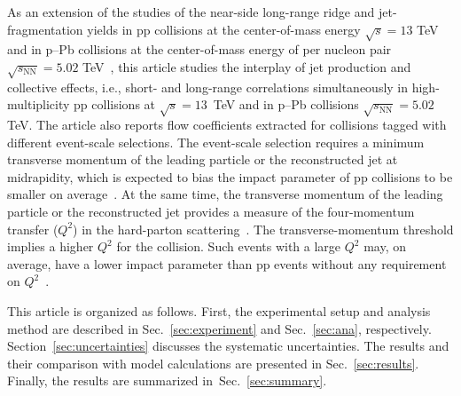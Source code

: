 As an extension of the studies of the near-side long-range ridge and jet-fragmentation yields in pp collisions at the center-of-mass energy $\sqrt{s}=13$ TeV~\cite{ALICE:2021nir} and in p--Pb collisions at the center-of-mass energy of per nucleon pair $\sqrt{s_{\mathrm{NN}}}=5.02$ TeV~\cite{ALICE:2012eyl,ALICE:2013snk}, this article studies the interplay of jet production and collective effects, i.e., short- and long-range correlations simultaneously in high-multiplicity pp collisions at $\sqrt{s} =13$~TeV and in p--Pb collisions $\sqrt{s_{\mathrm{NN}}}=5.02$ TeV. The article also reports flow coefficients extracted for collisions tagged with different event-scale selections. The event-scale selection requires a minimum transverse momentum of the leading particle or the reconstructed jet at midrapidity, which is expected to bias the impact parameter of pp collisions to be smaller on average~\cite{Sjostrand:1986ep,Frankfurt:2003td,Frankfurt:2010ea}. At the same time, the transverse momentum of the leading particle or the reconstructed jet provides a measure of the four-momentum transfer ($Q^2$) in the hard-parton scattering~\cite{Chatrchyan:2012tt, Chatrchyan:2011id,ALICE:2022fnb}. The transverse-momentum threshold implies a higher $Q^2$ for the collision. Such events with a large $Q^2$ may, on average, have a lower impact parameter than pp events without any requirement on $Q^2$~\cite{Frankfurt:2003td}.

This article is organized as follows. First, the experimental setup and analysis method are described in Sec.~\ref{sec:experiment} and Sec.~\ref{sec:ana}, respectively. Section~\ref{sec:uncertainties} discusses the systematic uncertainties. The results and their comparison with model calculations are presented in Sec.~\ref{sec:results}. Finally, the results are summarized in~Sec.~\ref{sec:summary}.

 
